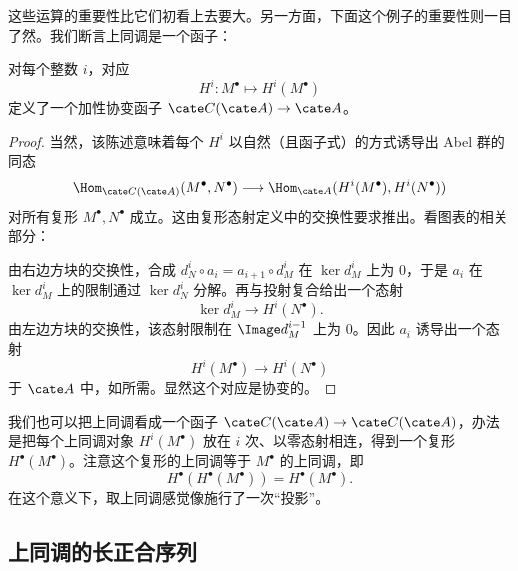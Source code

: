 这些运算的重要性比它们初看上去要大。另一方面，下面这个例子的重要性则一目了然。我们断言上同调是一个函子：

\begin{lemma}
\label{lem:3.4-cohomology-functor}
对每个整数 $i$，对应
\[
H^i:M^\bullet\mapsto H^i(M^\bullet)
\]
定义了一个加性协变函子 $\cate C(\cate A)\to\cate A$。
\end{lemma}

\begin{proof}
当然，该陈述意味着每个 $H^i$ 以自然（且函子式）的方式诱导出 Abel 群的同态
\[
\Hom_{\cate C(\cate A)}(M^\bullet, N^\bullet)\longrightarrow \Hom_{\cate A}(H^i(M^\bullet), H^i(N^\bullet))
\]
对所有复形 $M^\bullet,N^\bullet$ 成立。这由复形态射定义中的交换性要求推出。看图表的相关部分：
\begin{center}
\end{center}
由右边方块的交换性，合成 $d_N^i\circ a_i=a_{i+1}\circ d_M^i$ 在 $\ker d_M^i$ 上为 $0$，于是 $a_i$ 在 $\ker d_M^i$ 上的限制通过 $\ker d_N^i$ 分解。再与投射复合给出一个态射
\[
\ker d_M^i\longrightarrow H^i(N^\bullet).
\]
由左边方块的交换性，该态射限制在 $\Image d_M^{i-1}$ 上为 $0$。因此 $a_i$ 诱导出一个态射
\[
H^i(M^\bullet)\longrightarrow H^i(N^\bullet)
\]
于 $\cate A$ 中，如所需。显然这个对应是协变的。
\end{proof}

我们也可以把上同调看成一个函子 $\cate C(\cate A)\to \cate C(\cate A)$，办法是把每个上同调对象 $H^i(M^\bullet)$ 放在 $i$ 次、以零态射相连，得到一个复形 $H^\bullet(M^\bullet)$。注意这个复形的上同调等于 $M^\bullet$ 的上同调，即
\[
H^\bullet(H^\bullet(M^\bullet))=H^\bullet(M^\bullet).
\]
在这个意义下，取上同调感觉像施行了一次“投影”。

\subsection{上同调的长正合序列}
\label{subsec:3.3-les}

